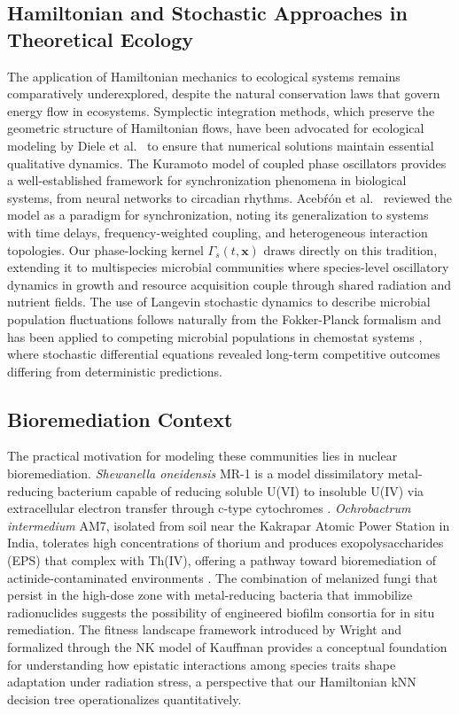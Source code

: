 \documentclass[11pt]{article}
\begin{document}
\subsection{Hamiltonian and Stochastic Approaches in Theoretical Ecology}

The application of Hamiltonian mechanics to ecological systems remains comparatively
underexplored, despite the natural conservation laws that govern energy flow in ecosystems.
Symplectic integration methods, which preserve the geometric structure of Hamiltonian flows,
have been advocated for ecological modeling by Diele et al.\ \cite{diele2015} to ensure that
numerical solutions maintain essential qualitative dynamics. The Kuramoto model of coupled phase
oscillators \cite{kuramoto1984} provides a well-established framework for synchronization
phenomena in biological systems, from neural networks to circadian rhythms. Aceb\'r\'on et al.\
\cite{acebron2005} reviewed the model as a paradigm for synchronization, noting its
generalization to systems with time delays, frequency-weighted coupling, and heterogeneous
interaction topologies. Our phase-locking kernel $\Gamma_s(t,\mathbf{x})$ draws directly on
this tradition, extending it to multispecies microbial communities where species-level
oscillatory dynamics in growth and resource acquisition couple through shared radiation and
nutrient fields. The use of Langevin stochastic dynamics to describe microbial population
fluctuations follows naturally from the Fokker-Planck formalism and has been applied to
competing microbial populations in chemostat systems \cite{campillo2017}, where stochastic
differential equations revealed long-term competitive outcomes differing from deterministic
predictions.

\subsection{Bioremediation Context}

The practical motivation for modeling these communities lies in nuclear bioremediation.
\textit{Shewanella oneidensis} MR-1 is a model dissimilatory metal-reducing bacterium capable
of reducing soluble U(VI) to insoluble U(IV) via extracellular electron transfer through
c-type cytochromes \cite{heidelberg2002,veeramani2011}. \textit{Ochrobactrum intermedium} AM7,
isolated from soil near the Kakrapar Atomic Power Station in India, tolerates high concentrations
of thorium and produces exopolysaccharides (EPS) that complex with Th(IV), offering a pathway
toward bioremediation of actinide-contaminated environments \cite{shukla2020}. The combination
of melanized fungi that persist in the high-dose zone with metal-reducing bacteria that
immobilize radionuclides suggests the possibility of engineered biofilm consortia for in situ
remediation. The fitness landscape framework introduced by Wright \cite{wright1932} and
formalized through the NK model of Kauffman \cite{kauffman1989} provides a conceptual foundation
for understanding how epistatic interactions among species traits shape adaptation under
radiation stress, a perspective that our Hamiltonian kNN decision tree operationalizes
quantitatively.
\end{document}
